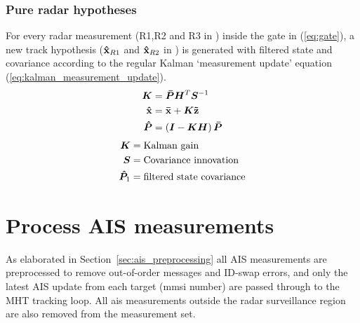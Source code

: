 \subsubsection{Pure radar hypotheses}
For every radar measurement (R1,R2 and R3 in ) inside the gate in (\ref{eq:gate}), a new track hypothesis (\(\boldsymbol{\mathbf{\hat{x}}}_{R1}\) and \(\boldsymbol{\mathbf{\hat{x}}}_{R2}\) in ) is generated with filtered state and covariance according to the regular Kalman `measurement update' equation (\ref{eq:kalman_measurement_update}).
\begin{equation}\label{eq:kalman_measurement_update}
\begin{split}
\bm{K} 	&= \bm{\bar{P}} \bm{H}^T \bm{S}^{-1} \\
\boldsymbol{\mathbf{\hat{x}}} &= \boldsymbol{\mathbf{\bar{x}}} + \bm{K} \boldsymbol{\mathbf{\tilde{z}}} \\
\bm{\hat{P}} &= \left(\bm{I} - \bm{K} \bm{H} \right) \bm{\bar{P}} \\
\end{split}
\end{equation}
\begin{equation*}
\begin{split}
\bm{K}			&= \text{Kalman gain} \\
\bm{S}			&= \text{Covariance innovation} \\
\bm{\hat{P}}_1 	&= \text{filtered state covariance} \\
\end{split}
\end{equation*}

\section{Process AIS measurements}\label{sec:process_ais_measurements}
As elaborated in Section~\ref{sec:ais_preprocessing} all AIS measurements are preprocessed to remove out-of-order messages and ID-swap errors, and only the latest AIS update from each target (\gls{mmsi} number) are passed through to the MHT tracking loop. All \gls{ais} measurements outside the radar surveillance region are also removed from the measurement set.

